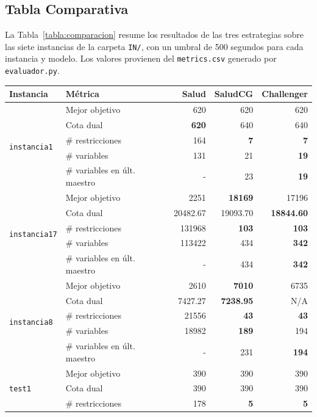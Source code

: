 \documentclass[12pt]{article}
\numberwithin{algorithm}{section}
\begin{document}
\subsection{Tabla Comparativa}

La Tabla~\ref{tabla:comparacion} resume los resultados de las tres estrategias sobre
las siete instancias de la carpeta \texttt{IN/}, con un umbral de 500 segundos para
cada instancia y modelo. Los valores provienen del \texttt{metrics.csv} generado por
\texttt{evaluador.py}.

\begin{table}[H]
\centering
\small
\begin{tabular}{|l|l|r|r|r|}
\hline
\textbf{Instancia} & \textbf{Métrica} & \textbf{Salud} & \textbf{SaludCG} & \textbf{Challenger} \\
\hline
\multirow{5}{*}{\texttt{instancia1}}
 & Mejor objetivo & 620 & 620 & 620 \\
 & Cota dual & \textbf{620} & 640 & 640 \\
 & \# restricciones & 164 & \textbf{7} & \textbf{7} \\
 & \# variables & 131 & 21 & \textbf{19} \\
 & \# variables en últ. maestro & - & 23 & \textbf{19} \\
\hline
\multirow{5}{*}{\texttt{instancia17}}
 & Mejor objetivo & 2251 & \textbf{18169} & 17196 \\
 & Cota dual & 20482.67 & 19093.70 & \textbf{18844.60} \\
 & \# restricciones & 131968 & \textbf{103} & \textbf{103} \\
 & \# variables & 113422 & 434 & \textbf{342} \\
 & \# variables en últ. maestro & - & 434 & \textbf{342} \\
\hline
\multirow{5}{*}{\texttt{instancia8}}
 & Mejor objetivo & 2610 & \textbf{7010} & 6735 \\
 & Cota dual & 7427.27 & \textbf{7238.95} & N/A \\
 & \# restricciones & 21556 & \textbf{43} & \textbf{43} \\
 & \# variables & 18982 & \textbf{189} & 194 \\
 & \# variables en últ. maestro & - & 231 & \textbf{194} \\
\hline
\multirow{5}{*}{\texttt{test1}}
 & Mejor objetivo & 390 & 390 & 390 \\
 & Cota dual & 390 & 390 & 390 \\
 & \# restricciones & 178 & \textbf{5} & \textbf{5} \\

\end{tabular}
\end{table}
\end{document}
